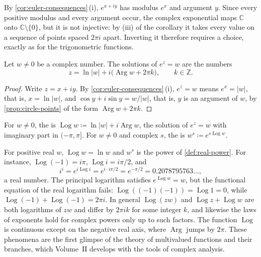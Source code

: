 By \cref{cor:euler-consequences}\,(i), $e^{x+iy}$ has modulus $e^x$ and argument $y$. Since every positive modulus and every argument occur, the complex exponential maps $\mathbb C$ onto $\mathbb C\setminus\{0\}$, but it is not injective: by (iii) of the corollary it takes every value on a sequence of points spaced $2\pi i$ apart. Inverting it therefore requires a choice, exactly as for the trigonometric functions.

\begin{proposition}
\label{prop:complex-log}
Let $w\ne0$ be a complex number. The solutions of $e^z=w$ are the numbers
\[
z=\ln|w|+i\bigl(\operatorname{Arg}w+2\pi k\bigr),\qquad k\in\mathbb Z .
\]
\end{proposition}

\begin{proof}
Write $z=x+iy$. By \cref{cor:euler-consequences}\,(i), $e^z=w$ means $e^x=|w|$, that is, $x=\ln|w|$, and $\cos y+i\sin y=w/|w|$, that is, $y$ is an argument of $w$, by \cref{prop:circle-points} of the form $\operatorname{Arg}w+2\pi k$.
\end{proof}

\begin{definition}
\label{def:complex-log}
For $w\ne0$, the  is $\operatorname{Log}w\coloneqq\ln|w|+i\operatorname{Arg}w$, the solution of $e^z=w$ with imaginary part in $(-\pi,\pi]$. For $w\ne0$ and complex $s$, the  is $w^s\coloneqq e^{s\operatorname{Log}w}$.
\end{definition}

For positive real $w$, $\operatorname{Log}w=\ln w$ and $w^s$ is the power of \cref{def:real-power}. For instance, $\operatorname{Log}(-1)=i\pi$, $\operatorname{Log}i=i\pi/2$, and
\[
i^i=e^{i\operatorname{Log}i}=e^{i\cdot i\pi/2}=e^{-\pi/2}=0.2078795763\ldots,
\]
a real number. The principal logarithm satisfies $e^{\operatorname{Log}w}=w$, but the functional equation of the real logarithm fails: $\operatorname{Log}((-1)(-1))=\operatorname{Log}1=0$, while $\operatorname{Log}(-1)+\operatorname{Log}(-1)=2\pi i$. In general $\operatorname{Log}(zw)$ and $\operatorname{Log}z+\operatorname{Log}w$ are both logarithms of $zw$ and differ by $2\pi ik$ for some integer $k$, and likewise the laws of exponents hold for complex powers only up to such factors. The function $\operatorname{Log}$ is continuous except on the negative real axis, where $\operatorname{Arg}$ jumps by $2\pi$. These phenomena are the first glimpse of the theory of multivalued functions and their branches, which Volume~II develops with the tools of complex analysis.

